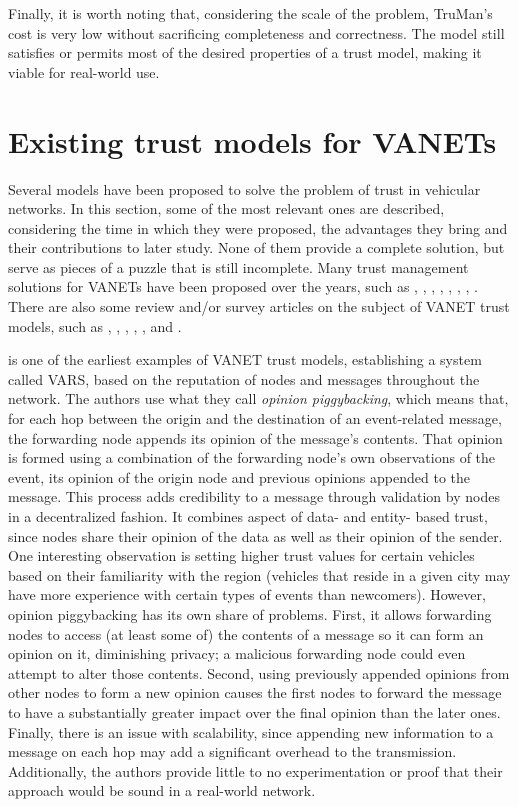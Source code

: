 Finally, it is worth noting that, considering the scale of the problem, TruMan's cost is very low without sacrificing completeness and correctness.
The model still satisfies or permits most of the desired properties of a trust model, making it viable for real-world use.

\section{Existing trust models for VANETs}
 
Several models have been proposed to solve the problem of trust in vehicular networks. 
In this section, some of the most relevant ones are described, considering the time in which they were proposed, the advantages they bring and their contributions to later study. 
None of them provide a complete solution, but serve as pieces of a puzzle that is still incomplete. 
Many trust management solutions for VANETs have been proposed over the years, such as \cite{patwardhan2006data}, \cite{gerlach2007trust}, \cite{raya2008data}, \cite{huang2010situation}, \cite{ding2013novel}, \cite{haddadou2013trust}, \cite{liu2016lsot}, \cite{kerrache2016detection}.
There are also some review and/or survey articles on the subject of VANET trust models, such as \cite{zhang2011survey}, \cite{ma2011survey}, \cite{zhang2012trust}, \cite{mejri2014survey}, \cite{soleymani2015trust} \cite{sengar2016survey}, and \cite{dwivedi2016review}. 

\cite{dotzer2005vars} is one of the earliest examples of VANET trust models, establishing a system called VARS, based on the reputation of nodes and messages throughout the network.
The authors use what they call \textit{opinion piggybacking}, which means that, for each hop between the origin and the destination of an event-related message, the forwarding node appends its opinion of the message's contents.
That opinion is formed using a combination of the forwarding node's own observations of the event, its opinion of the origin node and previous opinions appended to the message.
This process adds credibility to a message through validation by nodes in a decentralized fashion.
It combines aspect of data- and entity- based trust, since nodes share their opinion of the data as well as their opinion of the sender. 
One interesting observation is setting higher trust values for certain vehicles based on their familiarity with the region (vehicles that reside in a given city may have more experience with certain types of events than newcomers).
However, opinion piggybacking has its own share of problems.
First, it allows forwarding nodes to access (at least some of) the contents of a message so it can form an opinion on it, diminishing privacy; a malicious forwarding node could even attempt to alter those contents.
Second, using previously appended opinions from other nodes to form a new opinion causes the first nodes to forward the message to have a substantially greater impact over the final opinion than the later ones.
Finally, there is an issue with scalability, since appending new information to a message on each hop may add a significant overhead to the transmission. Additionally, the authors provide little to no experimentation or proof that their approach would be sound in a real-world network.

